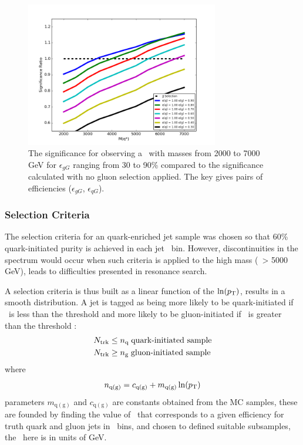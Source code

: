 \begin{figure}[htb]
 \centering
\includegraphics[width=0.75\textwidth]{fig/tagging/QuarkGluonSignalSignificance3.png}
\caption{ The significance for observing a \qstar\ with masses from 2000 to 7000 GeV 
for $\epsilon_{gG}$ ranging from 30 to 90\% compared to the significance calculated with no gluon selection applied. The key gives pairs of efficiencies ($\epsilon_{gG}$, $\epsilon_{qG}$).
  \label{fig:QuarkGluonSignalSignificance}}
\end{figure}

\FloatBarrier

\subsubsection{Selection Criteria}

The selection criteria for an quark-enriched jet sample was chosen so that 60\% quark-initiated purity is achieved in each jet \pt~bin. However, discontinuities in the \mjj spectrum would occur when such criteria is applied to the high mass (\pt~> 5000 GeV), leads to difficulties presented in resonance search. 


A selection criteria is thus built as a linear function of the $\ln(p_{\mathrm{T}}) $, results in a smooth \mjj distribution. A jet is tagged as being more likely to be quark-initiated if \ntrk~is less than
the threshold \nq and more likely to be gluon-initiated if \ntrk~is 
greater than the threshold \ngluon: 
\begin{align}
\ntrk & \le \nq \; \mbox{quark-initiated sample} %
\\
\ntrk	  & \ge \ngluon \; \mbox{gluon-initiated sample} \nonumber
\end{align}
where   
\begin{equation}
n_{\mathrm{q(g)}} = {c_{\mathrm{q(g)}} + m_{\mathrm{q(g)}} \ln(p_{\mathrm{T}})}  \label{eq:nqg2}
\end{equation}
parameters $m_{\mathrm{q(g)}}$ and $c_{\mathrm{q(g)}}$ are constants obtained from the MC samples, these are founded by  finding the value of \ntrk\ 
that corresponds to a given efficiency for truth quark and gluon jets in 
\pt~bins, and chosen to defined suitable subsamples, the \pt~here is in units of GeV.

